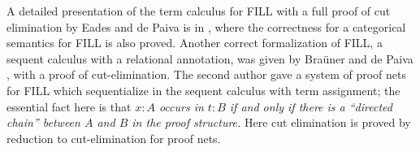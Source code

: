 
A detailed presentation of the term calculus for FILL with a full
proof of cut elimination by Eades and de Paiva is in
\cite{EadesP:2016}, where the correctness for a categorical semantics
for FILL is also proved.  Another correct formalization of FILL, a
sequent calculus with a relational annotation, was given by Bra\"uner
and de Paiva \cite{BraunerDePaiva:1997}, with a proof of
cut-elimination.  The second author \cite{Bellin:1997} gave a system
of proof nets for FILL which sequentialize in the sequent calculus
with term assignment; the essential fact here is that \emph{$x:A$
  occurs in $t:B$ if and only if there is a ``directed chain'' between
  $A$ and $B$ in the proof structure.}  Here cut elimination is proved
by reduction to cut-elimination for proof nets.


